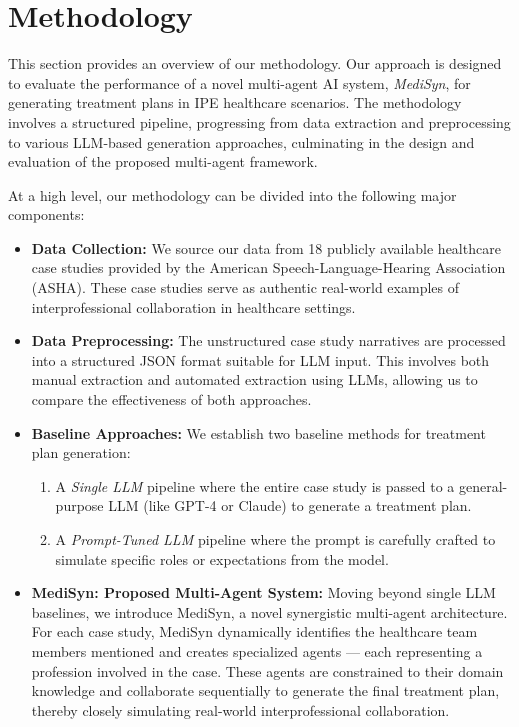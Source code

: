 \documentclass[pdflatex,sn-mathphys-num]{sn-jnl}%
\theoremstyle{thmstyleone}%
\theoremstyle{thmstyletwo}%
\theoremstyle{thmstylethree}%
\begin{document}
\section{Methodology}\label{sec3}

This section provides an overview of our methodology. Our approach is designed to evaluate the performance of a novel multi-agent AI system, \textit{MediSyn}, for generating treatment plans in IPE healthcare scenarios. The methodology involves a structured pipeline, progressing from data extraction and preprocessing to various LLM-based generation approaches, culminating in the design and evaluation of the proposed multi-agent framework.

At a high level, our methodology can be divided into the following major components:

\begin{itemize}
\item \textbf{Data Collection:} We source our data from 18 publicly available healthcare case studies provided by the American Speech-Language-Hearing Association (ASHA). These case studies serve as authentic real-world examples of interprofessional collaboration in healthcare settings.
\item \textbf{Data Preprocessing:} The unstructured case study narratives are processed into a structured JSON format suitable for LLM input. This involves both manual extraction and automated extraction using LLMs, allowing us to compare the effectiveness of both approaches.

\item \textbf{Baseline Approaches:} We establish two baseline methods for treatment plan generation:
\begin{enumerate}
\item A \textit{Single LLM} pipeline where the entire case study is passed to a general-purpose LLM (like GPT-4 or Claude) to generate a treatment plan.
\item A \textit{Prompt-Tuned LLM} pipeline where the prompt is carefully crafted to simulate specific roles or expectations from the model.
\end{enumerate}

\item \textbf{MediSyn: Proposed Multi-Agent System:} Moving beyond single LLM baselines, we introduce MediSyn, a novel synergistic multi-agent architecture. For each case study, MediSyn dynamically identifies the healthcare team members mentioned and creates specialized agents — each representing a profession involved in the case. These agents are constrained to their domain knowledge and collaborate sequentially to generate the final treatment plan, thereby closely simulating real-world interprofessional collaboration.


\end{itemize}
\end{document}
